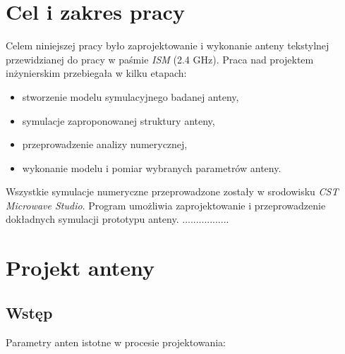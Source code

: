  \chapter{Cel i zakres pracy}

Celem niniejszej pracy było zaprojektowanie i wykonanie anteny tekstylnej przewidzianej do pracy w paśmie \emph{ISM} (2.4 GHz). 
Praca nad projektem inżynierskim przebiegała w kilku etapach:

\begin{itemize}\setlength{\itemsep}{0pt}
	
	\item stworzenie modelu symulacyjnego badanej anteny,

	\item symulacje zaproponowanej struktury anteny,

	\item przeprowadzenie analizy numerycznej,

	\item wykonanie modelu i pomiar wybranych parametrów anteny.

\end{itemize}

Wszystkie symulacje numeryczne przeprowadzone zostały w srodowisku \emph{CST Microwave Studio}. Program umożliwia zaprojektowanie i przeprowadzenie dokładnych symulacji prototypu anteny. .................



\chapter {Projekt anteny}

\section{Wstęp}

\noindent Parametry anten istotne w procesie projektowania: 

